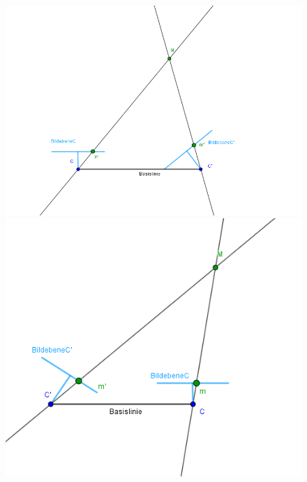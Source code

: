 \begin{figure}[!htb]
	\includegraphics[width=\linewidth]{images/P_Solution_one.png}
	\label{fig:awesome_image1}
	\endminipage\hfill
	\includegraphics[width=\linewidth]{images/P_Solution_two.png}
	\label{fig:awesome_image2}
	\endminipage\hfill
\end{figure}
